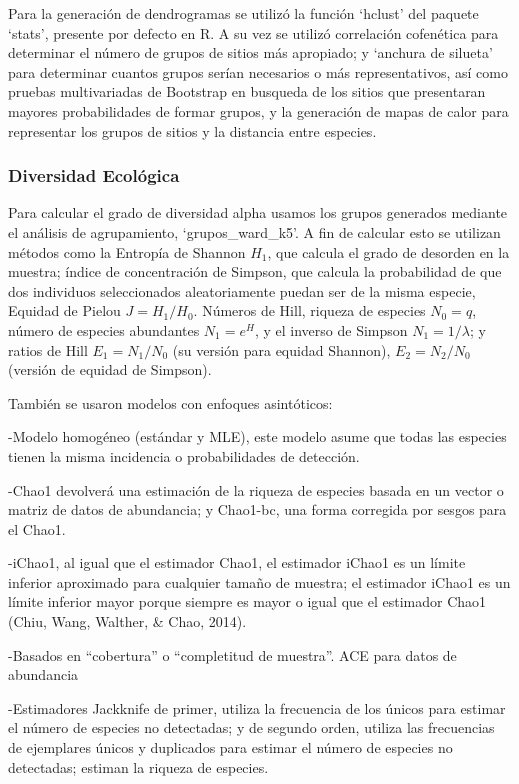 \documentclass[11pt,]{article}
\begin{document}
Para la generación de dendrogramas se utilizó la función `hclust' del
paquete `stats', presente por defecto en R. A su vez se utilizó
correlación cofenética para determinar el número de grupos de sitios más
apropiado; y `anchura de silueta' para determinar cuantos grupos serían
necesarios o más representativos, así como pruebas multivariadas de
Bootstrap en busqueda de los sitios que presentaran mayores
probabilidades de formar grupos, y la generación de mapas de calor para
representar los grupos de sitios y la distancia entre especies.

\subsubsection{Diversidad Ecológica}\label{diversidad-ecoluxf3gica}

Para calcular el grado de diversidad alpha usamos los grupos generados
mediante el análisis de agrupamiento, `grupos\_ward\_k5'. A fin de
calcular esto se utilizan métodos como la Entropía de Shannon \(H_1\),
que calcula el grado de desorden en la muestra; índice de concentración
de Simpson, que calcula la probabilidad de que dos individuos
seleccionados aleatoriamente puedan ser de la misma especie, Equidad de
Pielou \(J=H_1/H_0\). Números de Hill, riqueza de especies \(N_0=q\),
número de especies abundantes \(N_1=e^H\), y el inverso de Simpson
\(N_1=1/\lambda\); y ratios de Hill \(E_1=N_1/N_0\) (su versión para
equidad Shannon), \(E_2=N_2/N_0\) (versión de equidad de Simpson).

También se usaron modelos con enfoques asintóticos:

-Modelo homogéneo (estándar y MLE), este modelo asume que todas las
especies tienen la misma incidencia o probabilidades de detección.

-Chao1 devolverá una estimación de la riqueza de especies basada en un
vector o matriz de datos de abundancia; y Chao1-bc, una forma corregida
por sesgos para el Chao1.

-iChao1, al igual que el estimador Chao1, el estimador iChao1 es un
límite inferior aproximado para cualquier tamaño de muestra; el
estimador iChao1 es un límite inferior mayor porque siempre es mayor o
igual que el estimador Chao1 (Chiu, Wang, Walther, \& Chao, 2014).

-Basados en ``cobertura'' o ``completitud de muestra''. ACE para datos
de abundancia

-Estimadores Jackknife de primer, utiliza la frecuencia de los únicos
para estimar el número de especies no detectadas; y de segundo orden,
utiliza las frecuencias de ejemplares únicos y duplicados para estimar
el número de especies no detectadas; estiman la riqueza de especies.
\end{document}
